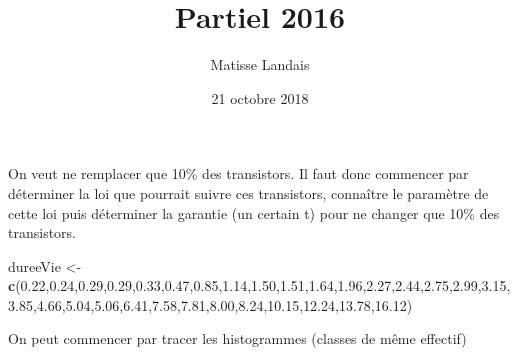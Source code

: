 \documentclass[]{article}
\title{Partiel 2016}
\author{Matisse Landais}
\date{21 octobre 2018}
\newenvironment{Shaded}{\begin{snugshade}}{\end{snugshade}}
\newcommand{\KeywordTok}[1]{\textcolor[rgb]{0.13,0.29,0.53}{\textbf{#1}}}
\newcommand{\FloatTok}[1]{\textcolor[rgb]{0.00,0.00,0.81}{#1}}
\newcommand{\StringTok}[1]{\textcolor[rgb]{0.31,0.60,0.02}{#1}}
\newcommand{\NormalTok}[1]{#1}
\begin{document}
\maketitle

On veut ne remplacer que 10\% des transistors. Il faut donc commencer
par déterminer la loi que pourrait suivre ces transistors, connaître le
paramètre de cette loi puis déterminer la garantie (un certain t) pour
ne changer que 10\% des transistors.

\begin{Shaded}
\begin{Highlighting}[]
\NormalTok{dureeVie <-}\StringTok{ }\KeywordTok{c}\NormalTok{(}\FloatTok{0.22}\NormalTok{,}\FloatTok{0.24}\NormalTok{,}\FloatTok{0.29}\NormalTok{,}\FloatTok{0.29}\NormalTok{,}\FloatTok{0.33}\NormalTok{,}\FloatTok{0.47}\NormalTok{,}\FloatTok{0.85}\NormalTok{,}\FloatTok{1.14}\NormalTok{,}\FloatTok{1.50}\NormalTok{,}\FloatTok{1.51}\NormalTok{,}\FloatTok{1.64}\NormalTok{,}\FloatTok{1.96}\NormalTok{,}\FloatTok{2.27}\NormalTok{,}\FloatTok{2.44}\NormalTok{,}\FloatTok{2.75}\NormalTok{,}\FloatTok{2.99}\NormalTok{,}\FloatTok{3.15}\NormalTok{,}\FloatTok{3.85}\NormalTok{,}\FloatTok{4.66}\NormalTok{,}\FloatTok{5.04}\NormalTok{,}\FloatTok{5.06}\NormalTok{,}\FloatTok{6.41}\NormalTok{,}\FloatTok{7.58}\NormalTok{,}\FloatTok{7.81}\NormalTok{,}\FloatTok{8.00}\NormalTok{,}\FloatTok{8.24}\NormalTok{,}\FloatTok{10.15}\NormalTok{,}\FloatTok{12.24}\NormalTok{,}\FloatTok{13.78}\NormalTok{,}\FloatTok{16.12}\NormalTok{)}
\end{Highlighting}
\end{Shaded}

On peut commencer par tracer les histogrammes (classes de même effectif)
\end{document}
